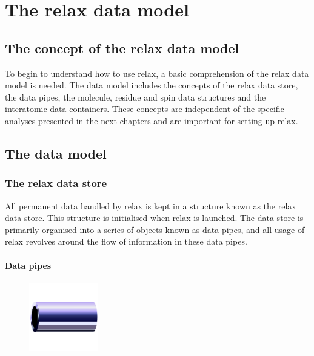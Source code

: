 
\chapter{The relax data model} \label{ch: data model}



\section{The concept of the relax data model}

To begin to understand how to use relax, a basic comprehension of the relax data model is needed.  The data model includes the concepts of the relax data store, the data pipes, the molecule, residue and spin data structures and the interatomic data containers.  These concepts are independent of the specific analyses presented in the next chapters and are important for setting up relax.




\section{The data model}



\subsection{The relax data store}

All permanent data handled by relax is kept in a structure known as the relax data store.  This structure is initialised when relax is launched.  The data store is primarily organised into a series of objects known as data pipes, and all usage of relax revolves around the flow of information in these data pipes.


\subsubsection{Data pipes}

\begin{figure}[h]
\includegraphics[width=3cm, bb=0 0 1701 1701]{graphics/misc/pipe_600x600}
\end{figure}


